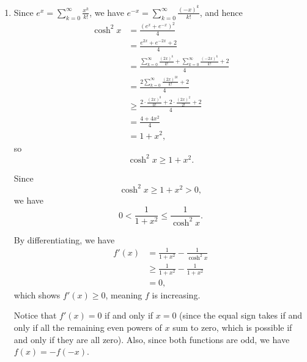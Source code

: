 \Question{\currfilebase}

\begin{enumerate}
    \item Since \(e^{x} = \sum_{k = 0}^{\infty} \frac{x^k}{k!}\), we have \(e^{-x} = \sum_{k = 0}^{\infty} \frac{(-x)^k}{k!}\), and hence
          \begin{align*}
              \cosh^2 x & = \frac{\left(e^x + e^{-x}\right)^2}{4}                                                            \\
                        & = \frac{e^{2x} + e^{-2x} + 2}{4}                                                                   \\
                        & = \frac{\sum_{k = 0}^{\infty} \frac{(2x)^k}{k!} + \sum_{k = 0}^{\infty} \frac{(-2x)^k}{k!} + 2}{4} \\
                        & = \frac{2\sum_{k = 0}^{\infty} \frac{(2x)^{2k}}{k!} + 2}{4}                                        \\
                        & \geq \frac{2 \cdot \frac{(2x)^{0}}{0!} + 2 \cdot \frac{(2x)^{2}}{2!} + 2}{4}                       \\
                        & = \frac{4 + 4x^2}{4}                                                                               \\
                        & = 1 + x^2,
          \end{align*}
          so
          \[
              \cosh^2 x \geq 1 + x^2.
          \]

          Since
          \[
              \cosh^2 x \geq 1 + x^2 > 0,
          \]
          we have
          \[
              0 < \frac{1}{1 + x^2} \leq \frac{1}{\cosh^2 x}.
          \]

          By differentiating, we have
          \begin{align*}
              f'(x) & = \frac{1}{1 + x^2} - \frac{1}{\cosh^2 x}  \\
                    & \geq \frac{1}{1 + x^2} - \frac{1}{1 + x^2} \\
                    & = 0,
          \end{align*}
          which shows \(f'(x) \geq 0\), meaning \(f\) is increasing.

          Notice that \(f'(x) = 0\) if and only if \(x = 0\) (since the equal sign takes if and only if all the remaining even powers of \(x\) sum to zero, which is possible if and only if they are all zero). Also, since both functions are odd, we have \(f(x) = - f(-x)\).


\end{enumerate}
